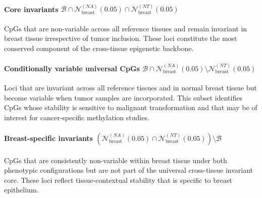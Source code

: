 \paragraph{Core invariants
\(
\mathcal{B}
\cap
\mathcal{N}_{\mathrm{breast}}^{(NA)}(0.05)
\cap
\mathcal{N}_{\mathrm{breast}}^{(NT)}(0.05)
\)}
CpGs that are non-variable across all reference tissues and 
remain invariant in breast tissue irrespective of tumor 
inclusion. These loci constitute the most conserved component 
of the cross-tissue epigenetic backbone.

\paragraph{Conditionally variable universal CpGs
\(
\mathcal{B}
\cap
\mathcal{N}_{\mathrm{breast}}^{(NA)}(0.05)
\setminus
\mathcal{N}_{\mathrm{breast}}^{(NT)}(0.05)
\)}
Loci that are invariant across all reference tissues and in 
normal breast tissue but become variable when tumor samples 
are incorporated. This subset identifies CpGs whose stability 
is sensitive to malignant transformation and that may be of 
interest for cancer-specific methylation studies.

\paragraph{Breast-specific invariants
\(
\left(
\mathcal{N}_{\mathrm{breast}}^{(NA)}(0.05)
\cap
\mathcal{N}_{\mathrm{breast}}^{(NT)}(0.05)
\right)
\setminus
\mathcal{B}
\)}
CpGs that are consistently non-variable within breast tissue 
under both phenotypic configurations but are not part of the 
universal cross-tissue invariant core. These loci reflect 
tissue-contextual stability that is specific to breast 
epithelium.

